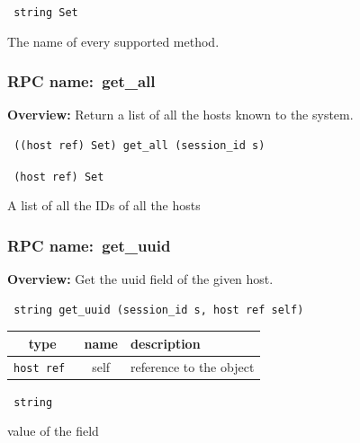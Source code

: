 {\tt 
string Set
}


The name of every supported method.
\vspace{0.3cm}
\vspace{0.3cm}
\vspace{0.3cm}
\subsubsection{RPC name:~get\_all}

{\bf Overview:} 
Return a list of all the hosts known to the system.

\begin{verbatim} ((host ref) Set) get_all (session_id s)\end{verbatim}


\vspace{0.3cm}

{\tt 
(host ref) Set
}


A list of all the IDs of all the hosts
\vspace{0.3cm}
\vspace{0.3cm}
\vspace{0.3cm}
\subsubsection{RPC name:~get\_uuid}

{\bf Overview:} 
Get the uuid field of the given host.

\begin{verbatim} string get_uuid (session_id s, host ref self)\end{verbatim}



 
\vspace{0.3cm}
\begin{tabular}{|c|c|p{7cm}|}
 \hline
{\bf type} & {\bf name} & {\bf description} \\ \hline
{\tt host ref } & self & reference to the object \\ \hline 

\end{tabular}

\vspace{0.3cm}

{\tt 
string
}


value of the field
\vspace{0.3cm}
\vspace{0.3cm}
\vspace{0.3cm}
